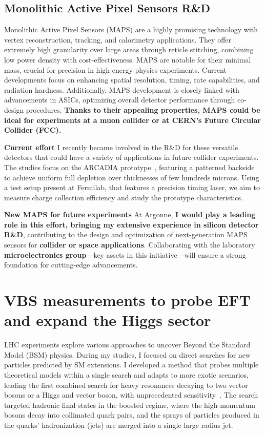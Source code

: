 {\begin{flushleft}
\vskip 5pt 
\subsection{Monolithic Active Pixel Sensors R\&D}
\vskip 4pt
Monolithic Active Pixel Sensors (MAPS) are a highly promising technology with vertex reconstruction, tracking, and calorimetry applications. They offer extremely high granularity over large areas through reticle stitching, combining low power density with cost-effectiveness. MAPS are notable for their minimal mass, crucial for precision in high-energy physics experiments.
Current developments focus on enhancing spatial resolution, timing, rate capabilities, and radiation hardness. Additionally, MAPS development is closely linked with advancements in ASICs, optimizing overall detector performance through co-design procedures. {\bf Thanks to their appealing properties, MAPS could be ideal for experiments at a muon collider or at CERN's Future Circular Collider (FCC).}

\textbf{Current effort}
I recently became involved in the R\&D for these versatile detectors that could have a variety of applications in future collider experiments. The studies focus on the ARCADIA prototype~\cite{[2]}, featuring a patterned backside to achieve uniform full depletion over thicknesses of few hundreds microns. Using a test setup present at Fermilab, that features a precision timing laser, we aim to measure charge collection efficiency and study the prototype characteristics.

\textbf{New MAPS for future experiments}
At Argonne, {\bf I would play a leading role in this effort, bringing my extensive experience in silicon detector R\&D}, contributing to the design and optimization of next-generation MAPS sensors for {\bf collider or space applications}. Collaborating with the laboratory {\bf microelectronics group}—key assets in this initiative—will ensure a strong foundation for cutting-edge advancements. 

\vskip 10pt
\section{VBS measurements to probe EFT and expand the Higgs sector}
\vskip 5pt
LHC experiments explore various approaches to uncover Beyond the Standard Model (BSM) physics. During my studies, I focused on direct searches for new particles predicted by SM extensions. I developed a method that probes multiple theoretical models within a single search and adapts to more exotic scenarios, leading the first combined search for heavy resonances decaying to two vector bosons or a Higgs and vector boson, with unprecedented sensitivity~\cite{[3]}. The search targeted hadronic final states in the boosted regime, where the high-momentum bosons decay into collimated quark pairs, and the sprays of particles produced in the quarks' hadronization (jets) are merged into a single large radius jet.%


\end{flushleft}}
